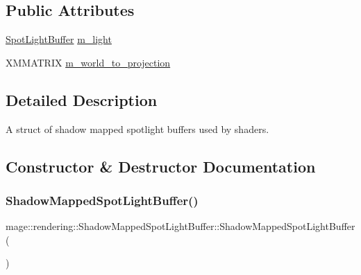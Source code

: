 \subsection*{Public Attributes}
\begin{DoxyCompactItemize}
\item 
\mbox{\hyperlink{structmage_1_1rendering_1_1_spot_light_buffer}{Spot\+Light\+Buffer}} \mbox{\hyperlink{structmage_1_1rendering_1_1_shadow_mapped_spot_light_buffer_a1df0d45520394b125e77b806f1b6265d}{m\+\_\+light}}
\item 
X\+M\+M\+A\+T\+R\+IX \mbox{\hyperlink{structmage_1_1rendering_1_1_shadow_mapped_spot_light_buffer_abb736c590c4a6efff217e15ef8abec4a}{m\+\_\+world\+\_\+to\+\_\+projection}}
\end{DoxyCompactItemize}


\subsection{Detailed Description}
A struct of shadow mapped spotlight buffers used by shaders. 

\subsection{Constructor \& Destructor Documentation}
\mbox{\label{structmage_1_1rendering_1_1_shadow_mapped_spot_light_buffer_a88d393bc59e25f35d29e478de8c81c89}} 
\subsubsection{\texorpdfstring{Shadow\+Mapped\+Spot\+Light\+Buffer()}{ShadowMappedSpotLightBuffer()}\hspace{0.1cm}{\footnotesize\ttfamily [1/3]}}
{\footnotesize\ttfamily mage\+::rendering\+::\+Shadow\+Mapped\+Spot\+Light\+Buffer\+::\+Shadow\+Mapped\+Spot\+Light\+Buffer (\begin{DoxyParamCaption}{ }\end{DoxyParamCaption})\hspace{0.3cm}{\ttfamily [noexcept]}}

